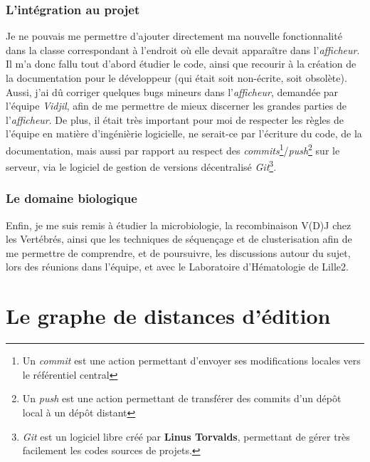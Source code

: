 \documentclass[12pt]{report}
\begin{document}
\begin{spacing}{1.2}
\subsection{L'intégration au projet}
Je ne pouvais me permettre d'ajouter directement ma nouvelle fonctionnalité dans la classe correspondant à l'endroit où elle devait apparaître dans l'\textit{afficheur}. Il m'a donc fallu tout d'abord étudier le code, ainsi que recourir à la création de la documentation pour le développeur (qui était soit non-écrite, soit obsolète). Aussi, j'ai dû corriger quelques bugs mineurs dans l'\textit{afficheur}, demandée par l'équipe \textit{Vidjil}, afin de me permettre de mieux discerner les grandes parties de l'\textit{afficheur}.
\newline
De plus, il était très important pour moi de respecter les règles de l'équipe en matière d'ingénièrie logicielle, ne serait-ce par l'écriture du code, de la documentation, mais aussi par rapport au respect des \textit{commits}\footnote{Un \textit{commit} est une action permettant d'envoyer ses modifications locales vers le référentiel central}/\textit{push}\footnote{Un \textit{push} est une action permettant de transférer des commits d'un dépôt local à un dépôt distant} sur le serveur, via le logiciel de gestion de versions décentralisé \textit{Git}\footnote{\textit{Git} est un logiciel libre créé par \textbf{Linus Torvalds}, permettant de gérer très facilement les codes sources de projets.}.

\subsection{Le domaine biologique}
Enfin, je me suis remis à étudier la microbiologie, la recombinaison V(D)J chez les Vertébrés, ainsi que les techniques de séquençage et de clusterisation afin de me permettre de comprendre, et de poursuivre, les discussions autour du sujet, lors des réunions dans l'équipe, et avec le Laboratoire d'Hématologie de Lille2.

\chapter{Le graphe de distances d'édition}



\end{spacing}
\end{document}
